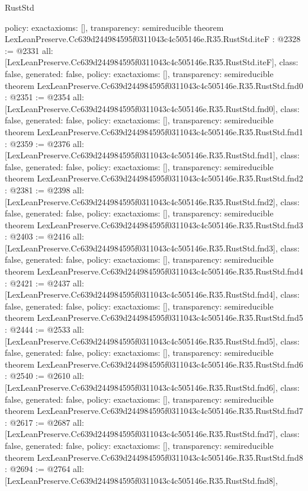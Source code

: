 \begin{lexlean}{RustStd}
\begin{coremodule}
{  policy: exact{axioms: []},
  transparency: semireducible
}
theorem LexLeanPreserve.Cc639d244984595f0311043c4c505146e.R35.RustStd.iteF : @2328 := @2331 {
  all: [LexLeanPreserve.Cc639d244984595f0311043c4c505146e.R35.RustStd.iteF],
  class: false,
  generated: false,
  policy: exact{axioms: []},
  transparency: semireducible
}
theorem LexLeanPreserve.Cc639d244984595f0311043c4c505146e.R35.RustStd.fnd0 : @2351 := @2354 {
  all: [LexLeanPreserve.Cc639d244984595f0311043c4c505146e.R35.RustStd.fnd0],
  class: false,
  generated: false,
  policy: exact{axioms: []},
  transparency: semireducible
}
theorem LexLeanPreserve.Cc639d244984595f0311043c4c505146e.R35.RustStd.fnd1 : @2359 := @2376 {
  all: [LexLeanPreserve.Cc639d244984595f0311043c4c505146e.R35.RustStd.fnd1],
  class: false,
  generated: false,
  policy: exact{axioms: []},
  transparency: semireducible
}
theorem LexLeanPreserve.Cc639d244984595f0311043c4c505146e.R35.RustStd.fnd2 : @2381 := @2398 {
  all: [LexLeanPreserve.Cc639d244984595f0311043c4c505146e.R35.RustStd.fnd2],
  class: false,
  generated: false,
  policy: exact{axioms: []},
  transparency: semireducible
}
theorem LexLeanPreserve.Cc639d244984595f0311043c4c505146e.R35.RustStd.fnd3 : @2403 := @2416 {
  all: [LexLeanPreserve.Cc639d244984595f0311043c4c505146e.R35.RustStd.fnd3],
  class: false,
  generated: false,
  policy: exact{axioms: []},
  transparency: semireducible
}
theorem LexLeanPreserve.Cc639d244984595f0311043c4c505146e.R35.RustStd.fnd4 : @2421 := @2437 {
  all: [LexLeanPreserve.Cc639d244984595f0311043c4c505146e.R35.RustStd.fnd4],
  class: false,
  generated: false,
  policy: exact{axioms: []},
  transparency: semireducible
}
theorem LexLeanPreserve.Cc639d244984595f0311043c4c505146e.R35.RustStd.fnd5 : @2444 := @2533 {
  all: [LexLeanPreserve.Cc639d244984595f0311043c4c505146e.R35.RustStd.fnd5],
  class: false,
  generated: false,
  policy: exact{axioms: []},
  transparency: semireducible
}
theorem LexLeanPreserve.Cc639d244984595f0311043c4c505146e.R35.RustStd.fnd6 : @2540 := @2610 {
  all: [LexLeanPreserve.Cc639d244984595f0311043c4c505146e.R35.RustStd.fnd6],
  class: false,
  generated: false,
  policy: exact{axioms: []},
  transparency: semireducible
}
theorem LexLeanPreserve.Cc639d244984595f0311043c4c505146e.R35.RustStd.fnd7 : @2617 := @2687 {
  all: [LexLeanPreserve.Cc639d244984595f0311043c4c505146e.R35.RustStd.fnd7],
  class: false,
  generated: false,
  policy: exact{axioms: []},
  transparency: semireducible
}
theorem LexLeanPreserve.Cc639d244984595f0311043c4c505146e.R35.RustStd.fnd8 : @2694 := @2764 {
  all: [LexLeanPreserve.Cc639d244984595f0311043c4c505146e.R35.RustStd.fnd8],
}
\end{coremodule}
\end{lexlean}
